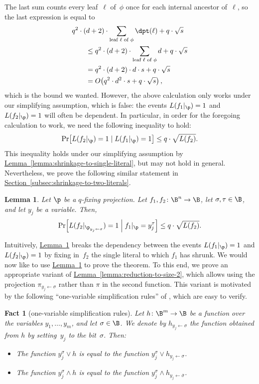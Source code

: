 \documentclass[11pt]{article}
\numberwithin{equation}{section}
\newtheorem{lemma}[theorem]{Lemma}
\newtheorem{fact}[theorem]{Fact}
\theoremstyle{definition}
\theoremstyle{plain}
\newcommand{\expref}[2]{\hyperref[#2]{#1~\ref{#2}}}
\theoremstyle{definition}\newtheorem{notation}[theorem]{Notation}\theoremstyle{plain}
\begin{document}
The last sum counts every leaf~$\ell$ of~$\phi$ once for each
internal ancestor of~$\ell$, so the last expression is equal to
\begin{align*}
 & q^{2}\cdot(d+2)\cdot\sum_{\text{leaf \ensuremath{\ell} of \ensuremath{\phi}}}\dpt(\ell)+q\cdot\sqrt{s}\\
 & \qquad\le q^{2}\cdot(d+2)\cdot\sum_{\text{leaf \ensuremath{\ell} of \ensuremath{\phi}}}d+q\cdot\sqrt{s}\\
 & \qquad=q^{2}\cdot(d+2)\cdot d\cdot s+q\cdot\sqrt{s}\\
 & \qquad=O\!\left(q^{2}\cdot d^{2}\cdot s+q\cdot\sqrt{s}\right),
\end{align*}
which is the bound we wanted. However, the above calculation only
works under our simplifying assumption, which is false: the events
$L(f_{1}|_{\p})=1$ and $L(f_{2}|_{\p})=1$ will often be dependent.
In particular, in order for the foregoing calculation to work, we
need the following inequality to hold: 
\[
\Pr\!\left[L(f_{2}|_{\p})=1\mid L(f_{1}|_{\p})=1\right]\le q\cdot\sqrt{L(f_{2})}.
\]
This inequality holds under our simplifying assumption by \expref{Lemma}{lemma:shrinkage-to-single-literal},
but may not hold in general. Nevertheless, we prove the following
similar statement in \expref{Section}{subsec:shrinkage-to-two-literals}. 
\begin{lemma}
\label{lemma:shrinkage-with-conditioning}Let $\p$ be a $q$-fixing projection.
Let $f_{1},f_{2}\colon\B^{n}\to\B$, let $\sigma,\tau\in\B$, and
let $y_{j}$ be a variable. Then, 
\[
\Pr\!\left[L(f_{2}|_{\p_{y_{j}\gets\sigma}})=1\;\middle|\;f_{1}|_{\p}=y_{j}^{\tau}\right]\le q\cdot\sqrt{L(f_{2})}.
\]
\end{lemma}

Intuitively, \expref{Lemma}{lemma:shrinkage-with-conditioning} breaks the dependency
between the events $L(f_{1}|_{\p})=1$ and $L(f_{2}|_{\p})=1$ by
fixing in~$f_{2}$ the single literal to which $f_{1}$ has shrunk.
We would now like to use \expref{Lemma}{lemma:shrinkage-with-conditioning} to prove
the theorem. To this end, we prove an appropriate variant of \expref{Lemma}{lemma:reduction-to-size-2},
which allows using the projection $\pi_{y_{j}\gets\sigma}$ rather
than $\pi$ in the second function. This variant is motivated by the
following ``one-variable simplification rules'' of \cite{H98},
which are easy to verify. 
\begin{fact}[one-variable simplification rules]
\label{fact:simplification-rules}Let $h\colon\B^{m}\to\B$ be a function
over the variables $y_{1},\ldots,y_{m}$, and let $\sigma\in\B$.
We denote by $h_{y_{j}\gets\sigma}$ the function obtained from $h$
by setting~$y_{j}$ to the bit~$\sigma$. Then: 
\begin{itemize}
\item The function $y_{j}^{\sigma}\vee h$ is equal to the function $y_{j}^{\sigma}\vee h_{y_{j}\gets\sigma}$. 
\item The function $y_{j}^{\sigma}\wedge h$ is equal to the function $y_{j}^{\sigma}\wedge h_{y_{j}\gets\overline{\sigma}}$. 
\end{itemize}
\end{fact}
\end{document}

